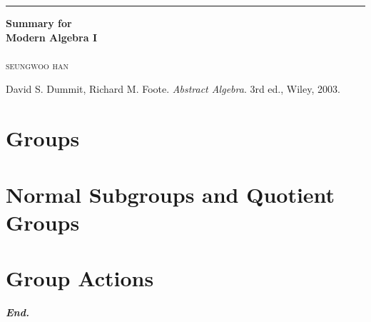 \documentclass[a4paper,12pt]{report}
\begin{document}

\begin{titlepage}
	\raggedleft

	\rule{1pt}{\textheight}
	\hspace{0.05\textwidth}
	\parbox[b]{0.75\textwidth}{

        {\Huge\bfseries Summary for\\[0.5\baselineskip] Modern Algebra I}\\[2\baselineskip]
		\\[4\baselineskip]
		{\Large\textsc{seungwoo han}}

		\vspace{0.5\textheight}

        {\noindent
        David S. Dummit, Richard M. Foote.
        \textit{Abstract Algebra}. 3rd ed.,
        Wiley, 2003.}\\[\baselineskip]
	}
\end{titlepage}
\tableofcontents
\hypersetup{
    colorlinks=true,
    linkcolor=red!50!black,
    filecolor=black,
    urlcolor=red!50!black,
}
\pagebreak

\chapter{Groups}







\chapter{Normal Subgroups and Quotient Groups}





\chapter{Group Actions}




\vfill
\begin{center}
    \textbf{\textit{End.}}
\end{center}
\end{document}
